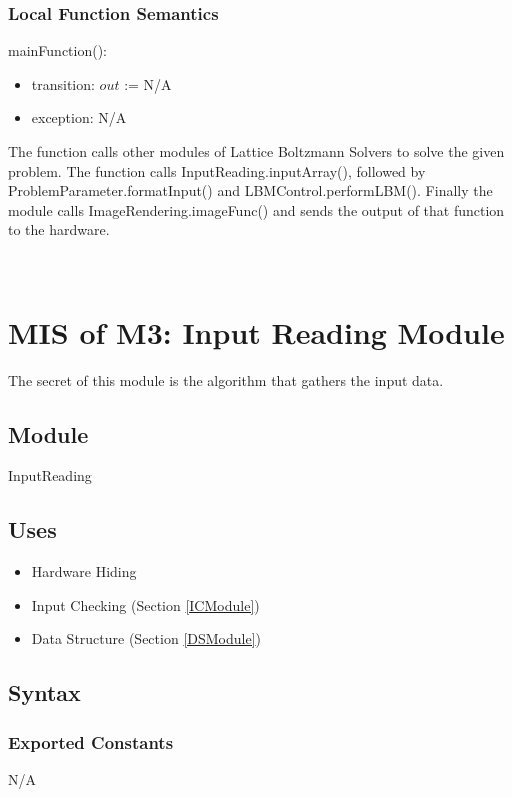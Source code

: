 \documentclass[12pt, titlepage]{article}
\newcommand{\famname}{Lattice Boltzmann Solvers}
\begin{document}
\subsubsection{Local Function Semantics}

\noindent mainFunction():
\begin{itemize}
	\item transition: $out$ := N/A
	\item exception: N/A
\end{itemize}

The function calls other modules of {\famname} to solve the given problem. The function calls InputReading.inputArray(), followed by ProblemParameter.formatInput() and LBMControl.performLBM(). Finally the module calls ImageRendering.imageFunc() and sends the output of that function to the hardware.


~\newpage

\section{MIS of M3: Input Reading Module} \label{IRModule} 

The secret of this module is the algorithm that gathers the input data.

\subsection{Module}

InputReading

\subsection{Uses}

\begin{itemize}
	\item Hardware Hiding
	\item Input Checking (Section \ref{ICModule})
	\item Data Structure (Section \ref{DSModule})
\end{itemize}

\subsection{Syntax}

\subsubsection{Exported Constants}
N/A
\end{document}
